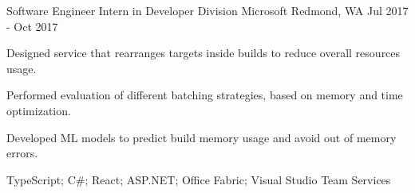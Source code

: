 

\begin{cventries}


  \cventry
    {Software Engineer Intern in Developer Division} %
    {Microsoft} %
    {Redmond, WA} %
    {Jul 2017 - Oct 2017} %
    {
      \begin{cvitems} %
        \item {Designed service that rearranges targets inside builds to reduce overall resources usage.}
        \item {Performed evaluation of different batching strategies, based on memory and time optimization.}
        \item {Developed ML models to predict build memory usage and avoid out of memory errors.}
        \item {TypeScript; C\#; React; ASP.NET; Office Fabric; Visual Studio Team Services}
      \end{cvitems}
    }


\end{cventries}
